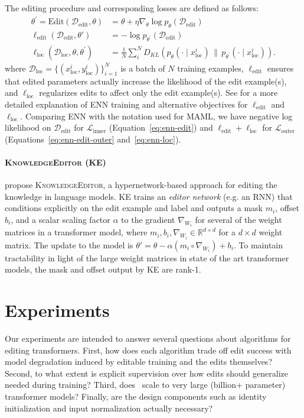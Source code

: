 \documentclass{article}
\begin{document}
The editing procedure and corresponding losses are defined as follows:
\begin{align}
    \label{eq:enn-edit}\theta^\prime = \text{Edit}(\mathcal{D}_\text{edit}, \theta) &= \theta + \eta \nabla_\theta \log p_\theta(\mathcal{D}_\text{edit}) \\
    \label{eq:enn-edit-outer}\ell_\text{edit}(\mathcal{D}_\text{edit}, \theta') &= -\log p_{\theta^\prime}(\mathcal{D}_\text{edit}) \\
    \label{eq:enn-loc}\ell_\text{loc}(\mathcal{D}_\text{loc}, \theta, \theta^\prime) &= \frac{1}{N}\sum_i^N D_{KL}(p_\theta(\cdot \mid x_\text{loc}^i)\,\|\, p_{\theta^\prime}(\cdot \mid x_\text{loc}^i)).
\end{align}
where $\mathcal{D}_\text{loc} = \{(x_\text{loc}^i, y_\text{loc}^i)\}_{i=1}^N$ is a batch of $N$ training examples, $\ell_\text{edit}$ ensures that edited parameters actually increase the likelihood of the edit example(s), and $\ell_\text{loc}$ regularizes edits to affect only the edit example(s). See \citet{Sinitsin2020Editable} for a more detailed explanation of ENN training and alternative objectives for $\ell_\text{edit}$ and $\ell_\text{loc}$. Comparing ENN with the notation used for MAML, we have negative log likelihood on $\mathcal{D}_\text{edit}$ for $\mathcal{L}_\text{inner}$ (Equation~\ref{eq:enn-edit}) and $\ell_\text{edit} + \ell_\text{loc}$ for $\mathcal{L}_\text{outer}$ (Equations~\ref{eq:enn-edit-outer} and~\ref{eq:enn-loc}). 

\paragraph{\textsc{KnowledgeEditor} (KE)}
\cite{Cao2021EditingFK} propose \textsc{KnowledgeEditor}, a hypernetwork-based approach for editing the knowledge in language models. KE trains an \textit{editor network} (e.g. an RNN) that conditions explicitly on the edit example and label and outputs a mask $m_i$, offset $b_i$, and a scalar scaling factor $\alpha$ to the gradient $\nabla_{W_i}$ for several of the weight matrices in a transformer model, where $m_i,b_i,\nabla_{W_i} \in \mathbb{R}^{d \times d}$ for a $d \times d$ weight matrix. The update to the model is $\theta' = \theta - \alpha (m_i \circ \nabla_{W_i}) + b_i$. To maintain tractability in light of the large weight matrices in state of the art transformer models, the mask and offset output by KE are rank-1.

\section{Experiments}
Our experiments are intended to answer several questions about algorithms for editing transformers. First, how does each algorithm trade off edit success with model degradation induced by editable training and the edits themselves? Second, to what extent is explicit supervision over how edits should generalize needed during training? Third, does \name~scale to very large (billion+ parameter) transformer models? Finally, are the design components such as identity initialization and input normalization actually necessary?
\end{document}
